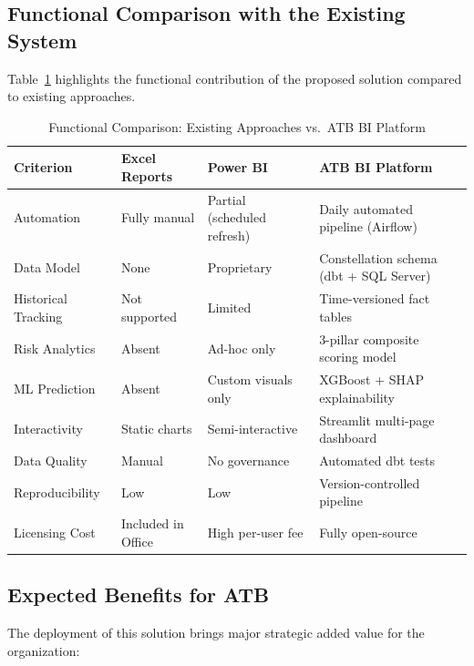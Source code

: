 \subsection{Functional Comparison with the Existing System}

Table~\ref{tab:comparatif_existant_solution} highlights the functional contribution of the
proposed solution compared to existing approaches.

\begin{table}[H]
\centering
\small
\renewcommand{\arraystretch}{1.5}
\caption{Functional Comparison: Existing Approaches vs.\ ATB BI Platform}
\label{tab:comparatif_existant_solution}
\begin{tabular}{|p{3.2cm}|p{3.3cm}|p{3.3cm}|p{4.3cm}|}
\hline
\rowcolor{blue!15}
\textbf{Criterion} & \textbf{Excel Reports} & \textbf{Power BI} & \textbf{ATB BI Platform} \\ \hline
Automation & Fully manual & Partial (scheduled refresh) & Daily automated pipeline (Airflow) \\ \hline
Data Model & None & Proprietary & Constellation schema (dbt + SQL Server) \\ \hline
Historical Tracking & Not supported & Limited & Time-versioned fact tables \\ \hline
Risk Analytics & Absent & Ad-hoc only & 3-pillar composite scoring model \\ \hline
ML Prediction & Absent & Custom visuals only & XGBoost + SHAP explainability \\ \hline
Interactivity & Static charts & Semi-interactive & Streamlit multi-page dashboard \\ \hline
Data Quality & Manual & No governance & Automated dbt tests \\ \hline
Reproducibility & Low & Low & Version-controlled pipeline \\ \hline
Licensing Cost & Included in Office & High per-user fee & Fully open-source \\ \hline
\end{tabular}
\end{table}

\subsection{Expected Benefits for ATB}

The deployment of this solution brings major strategic added value for the organization:

